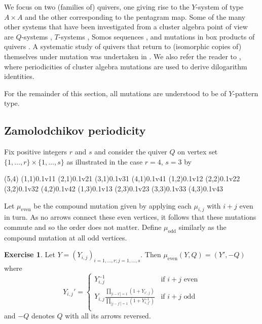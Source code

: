 \documentclass{amsart}
\theoremstyle{definition}
\newtheorem{exercise}[theorem]{Exercise}
\theoremstyle{remark}
\numberwithin{equation}{section}
\begin{document}
	We focus on two (families of) quivers, one giving rise to the $Y$-system of type $A \times A$ and the other corresponding to the pentagram map. Some of the many other systems that have been investigated from a cluster algebra point of view are $Q$-systems \cite{dFK10}, $T$-systems \cite{dFK09}, Somos sequences \cite{H07}, and mutations in box products of quivers \cite{P15}. A systematic study of quivers that return to (isomorphic copies of) themselves under mutation was undertaken in \cite{FM11}.  We also refer the reader to \cite{N11,GNR16}, where periodicities of cluster algebra mutations are used to derive dilogarithm identities.

For the remainder of this section, all mutations are understood to be of $Y$-pattern type.

\subsection{Zamolodchikov periodicity}
	Fix positive integers $r$ and $s$ and consider the quiver $Q$ on vertex set $\{1,\ldots, r \} \times \{1,\ldots, s\}$ as illustrated in the case $r=4$, $s=3$ by
	
	\begin{pspicture}(5,4)
		\cnode(1,1){0.1}{v11}
		\cnode(2,1){0.1}{v21}
		\cnode(3,1){0.1}{v31}
		\cnode(4,1){0.1}{v41}
		\cnode(1,2){0.1}{v12}
		\cnode(2,2){0.1}{v22}
		\cnode(3,2){0.1}{v32}
		\cnode(4,2){0.1}{v42}
		\cnode(1,3){0.1}{v13}
		\cnode(2,3){0.1}{v23}
		\cnode(3,3){0.1}{v33}
		\cnode(4,3){0.1}{v43}
	\end{pspicture}
	
	Let $\mu_{\textrm{even}}$ be the compound mutation given by applying each $\mu_{i,j}$ with $i+j$ even in turn.  As no arrows connect these even vertices, it follows that these mutations commute and so the order does not matter.  Define $\mu_{\textrm{odd}}$ similarly as the compound mutation at all odd vertices.
	
	\begin{exercise}
		Let $Y = (Y_{i,j})_{i=1,\ldots, r; j=1,\ldots, s}$.  Then $\mu_{\textrm{even}}(Y,Q) = (Y',-Q)$ where
		\begin{equation} \label{eq:YSystemCases}
			Y_{i,j}' = \begin{cases}
			Y_{i,j}^{-1} & \textrm{if $i+j$ even} \\
			Y_{i,j}\frac{\displaystyle\prod_{|i-i'|=1}(1+Y_{i',j})}{\displaystyle\prod_{|j-j'|=1}(1+Y_{i,j'}^{-1})} & \textrm{if $i+j$ odd} \\
			\end{cases}
		\end{equation}
		and $-Q$ denotes $Q$ with all its arrows reversed.
	\end{exercise}
	
\end{document}
